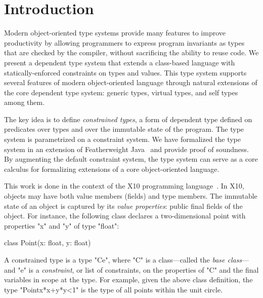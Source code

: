 \documentclass[preprint,nocopyrightspace,9pt]{sigplanconf}
\begin{document}
\section{Introduction}
\label{sec:intro}






Modern object-oriented type systems provide 
many features to improve productivity by 
allowing programmers to express program
invariants as types that are
checked by the compiler, without sacrificing the ability to
reuse code.
We present a dependent type system
that extends a class-based language with
statically-enforced constraints on types and values.
This type system 
supports several features of modern object-oriented 
language through natural extensions of the core dependent type
system: generic types, virtual types, and self types
among them.

The key idea is to define \emph{constrained types},
a form of dependent type
defined on predicates over types and over the immutable state of
the program.
The type system is parametrized on a constraint system.
We have formalized the type system in an extension of
Featherweight Java~\cite{FJ}
and provide proof of soundness.
By augmenting the default constraint system,
the type system can serve as a core calculus 
for formalizing extensions of a core object-oriented language. 

This work is done in the context of the X10
programming language~\cite{X10}.
In X10, objects may have both value members (fields)
and type members.
The immutable state of an object is captured by its
\emph{value properties}: public final fields of the object.
For instance, the following class declares a two-dimensional
point with properties \xcd"x" and \xcd"y" of type \xcd"float":
\begin{xten}
class Point(x: float, y: float) { }
\end{xten}

A constrained type is a type \xcd"C{e}", where \xcd"C" is a
class---called the \emph{base class}---and \xcd"e" is a
\emph{constraint}, or list of constraints, on the properties of
\xcd"C" and the final variables in scope at the type.
For example, given the above class definition,
the type \xcd"Point{x*x+y*y<1}" is the type of all
points within the unit circle.
\end{document}

